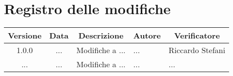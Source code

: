 
\fancyfoot[C]{\thepage}                %



\section*{Registro delle modifiche}

\begin{table}[h]
    \centering
    \begin{tabular}{|c|c|p{5cm}|p{3cm}|p{3cm}|}
        \hline
        \rowcolor[gray]{0.75}
        \textbf{Versione} & \textbf{Data} & \multicolumn{1}{|c|}{\textbf{Descrizione}} & 
        \multicolumn{1}{|c|}{\textbf{Autore}} & \multicolumn{1}{|c|}{\textbf{Verificatore}}\\
        \hline
        1.0.0 & ... & Modifiche a ... & ... & Riccardo Stefani\\
        \hline
        ... & ... & Modifiche a ... & ... & ...\\
        \hline


\end{tabular}
\end{table}
